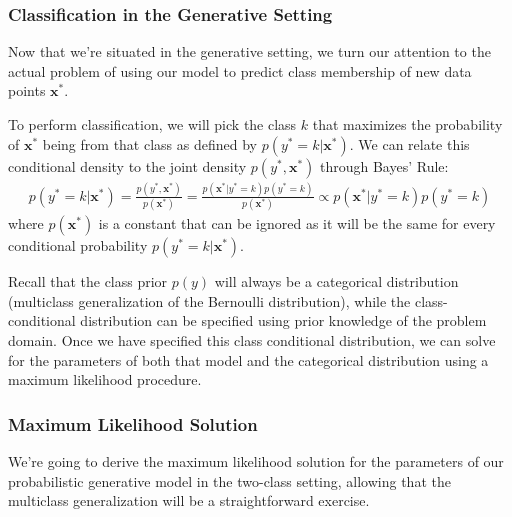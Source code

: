
\subsubsection{Classification in the Generative Setting}
Now that we're situated in the generative setting, we turn our attention to the actual problem of using our model to predict class membership of new data points $\textbf{x}^{*}$.

To perform classification, we will pick the class $k$ that maximizes the probability of $\textbf{x}^{*}$ being from that class as defined by $p(y^{*} = k | \textbf{x}^{*})$. We can relate this conditional density to the joint density $p(y^{*}, \textbf{x}^{*})$ through Bayes' Rule:
\begin{align*}
	p(y^{*} = k | \textbf{x}^{*}) = \frac{p(y^{*}, \textbf{x}^{*})}{p(\textbf{x}^{*})} = \frac{p(\textbf{x}^{*} | y^{*} = k)p(y^{*} = k)}{p(\textbf{x}^{*})} \propto p(\textbf{x}^{*} | y^{*} = k)p(y^{*} = k)
\end{align*}
where $p(\textbf{x}^{*})$ is a constant that can be ignored as it will be the same for every conditional probability $p(y^{*} = k | \textbf{x}^{*})$.

Recall that the class prior $p(y)$ will always be a categorical distribution (multiclass generalization of the Bernoulli distribution), while the class-conditional distribution can be specified using prior knowledge of the problem domain. Once we have specified this class conditional distribution, we can solve for the parameters of both that model and the categorical distribution using a maximum likelihood procedure.

\subsubsection{Maximum Likelihood Solution}
We're going to derive the maximum likelihood solution for the parameters of our probabilistic generative model in the two-class setting, allowing that the multiclass generalization will be a straightforward exercise.

